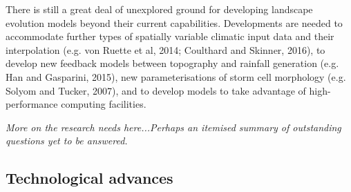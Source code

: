 There is still a great deal of unexplored ground for developing landscape evolution models beyond their current capabilities.  Developments are needed to accommodate further types of spatially variable climatic input data and their interpolation (e.g. von Ruette et al, 2014; Coulthard and Skinner, 2016), to develop new feedback models between topography and rainfall generation (e.g. Han and Gasparini, 2015), new parameterisations of storm cell morphology (e.g. Solyom and Tucker, 2007), and to develop models to take advantage of high-performance computing facilities. %

\textit{More on the research needs here...Perhaps an itemised summary of outstanding questions yet to be answered.}

\subsection{Technological advances}

